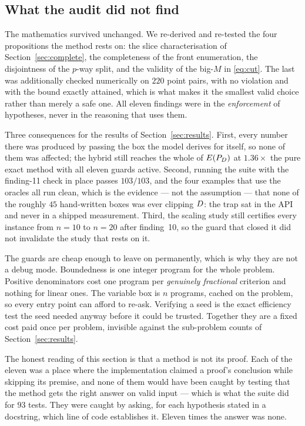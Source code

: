 \documentclass[11pt,a4paper]{article}
\begin{document}
\subsection{What the audit did not find}

The mathematics survived unchanged.  We re-derived and re-tested the four
propositions the method rests on: the slice characterisation of
Section~\ref{sec:complete}, the completeness of the front enumeration, the
disjointness of the $p$-way split, and the validity of the big-$M$ in
\eqref{eq:cut}.  The last was additionally checked numerically on $220$
point pairs, with no violation and with the bound exactly attained, which is
what makes it the smallest valid choice rather than merely a safe one.  All
eleven findings were in the \emph{enforcement} of hypotheses, never in the
reasoning that uses them.

Three consequences for the results of Section~\ref{sec:results}.  First, every
number there was produced by passing the box the model derives for itself, so
none of them was affected; the hybrid still reaches the whole of $E(P_{D})$ at
$1.36\times$ the pure exact method with all eleven guards active.  Second,
running the suite with the finding-11 check in place passes $103/103$, and the
four examples that use the oracles all run clean, which is the evidence --- not
the assumption --- that none of the roughly $45$ hand-written boxes was ever
clipping $D$: the trap sat in the API and never in a shipped measurement.
Third, the scaling study still certifies every instance from $n = 10$ to $n =
20$ after finding~10, so the guard that closed it did not invalidate the study
that rests on it.

The guards are cheap enough to leave on permanently, which is why they are not
a debug mode.  Boundedness is one integer program for the whole problem.
Positive denominators cost one program per \emph{genuinely fractional}
criterion and nothing for linear ones.  The variable box is $n$ programs,
cached on the problem, so every entry point can afford to re-ask.  Verifying a
seed is the exact efficiency test the seed needed anyway before it could be
trusted.  Together they are a fixed cost paid once per problem, invisible
against the sub-problem counts of Section~\ref{sec:results}.

\begin{remark}
The honest reading of this section is that a method is not its proof.  Each of
the eleven was a place where the implementation claimed a proof's conclusion
while skipping its premise, and none of them would have been caught by testing
that the method gets the right answer on valid input --- which is what the
suite did for $93$ tests.  They were caught by asking, for each hypothesis
stated in a docstring, which line of code establishes it.  Eleven times the
answer was none.
\end{remark}
\end{document}
